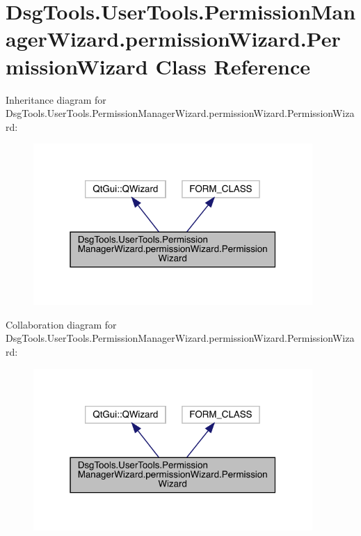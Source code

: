 \hypertarget{class_dsg_tools_1_1_user_tools_1_1_permission_manager_wizard_1_1permission_wizard_1_1_permission_wizard}{}\section{Dsg\+Tools.\+User\+Tools.\+Permission\+Manager\+Wizard.\+permission\+Wizard.\+Permission\+Wizard Class Reference}
\label{class_dsg_tools_1_1_user_tools_1_1_permission_manager_wizard_1_1permission_wizard_1_1_permission_wizard}


Inheritance diagram for Dsg\+Tools.\+User\+Tools.\+Permission\+Manager\+Wizard.\+permission\+Wizard.\+Permission\+Wizard\+:
\nopagebreak
\begin{figure}[H]
\begin{center}
\leavevmode
\includegraphics[width=301pt]{class_dsg_tools_1_1_user_tools_1_1_permission_manager_wizard_1_1permission_wizard_1_1_permission_wizard__inherit__graph}
\end{center}
\end{figure}


Collaboration diagram for Dsg\+Tools.\+User\+Tools.\+Permission\+Manager\+Wizard.\+permission\+Wizard.\+Permission\+Wizard\+:
\nopagebreak
\begin{figure}[H]
\begin{center}
\leavevmode
\includegraphics[width=301pt]{class_dsg_tools_1_1_user_tools_1_1_permission_manager_wizard_1_1permission_wizard_1_1_permission_wizard__coll__graph}
\end{center}
\end{figure}
